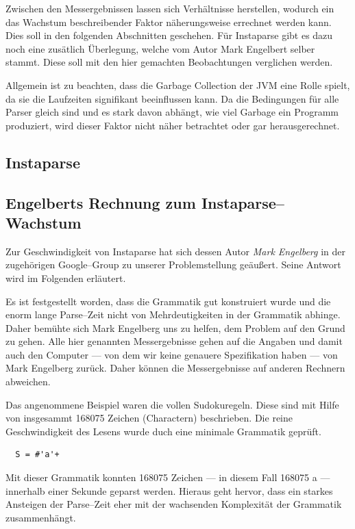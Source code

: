 \documentclass[ngerman,a4paper,abstracton,open=right,twoside=false,toc=listofnumbered,bibtotocnumbered]{scrreprt}
\begin{document}
Zwischen den Messergebnissen lassen sich Verhältnisse herstellen, wodurch ein das Wachstum beschreibender Faktor näherungsweise errechnet werden kann. Dies soll in den folgenden Abschnitten geschehen. Für Instaparse gibt es dazu noch eine zusätlich Überlegung, welche vom Autor Mark Engelbert selber stammt. Diese soll mit den hier gemachten Beobachtungen verglichen werden.

Allgemein ist zu beachten, dass die Garbage Collection der JVM eine Rolle spielt, da sie die Laufzeiten signifikant beeinflussen kann. Da die Bedingungen für alle Parser gleich sind und es stark davon abhängt, wie viel \glqq{}Garbage\grqq{} ein Programm produziert, wird dieser Faktor nicht näher betrachtet oder gar herausgerechnet.

\subsection{Instaparse}


\subsection{Engelberts Rechnung zum Instaparse--Wachstum}

Zur Geschwindigkeit von Instaparse hat sich dessen Autor \emph{Mark Engelberg} in der zugehörigen Google--Group zu unserer Problemstellung geäußert. Seine Antwort wird im Folgenden erläutert. \cite{instaparse-google-group}

Es ist festgestellt worden, dass die Grammatik gut konstruiert wurde und die enorm lange Parse--Zeit nicht von Mehrdeutigkeiten in der Grammatik abhinge. Daher bemühte sich Mark Engelberg uns zu helfen, dem Problem auf den Grund zu gehen. Alle hier genannten Messergebnisse gehen auf die Angaben und damit auch den Computer --- von dem wir keine genauere Spezifikation haben --- von Mark Engelberg zurück. Daher können die Messergebnisse auf anderen Rechnern abweichen.

Das angenommene Beispiel waren die vollen Sudokuregeln. Diese sind mit Hilfe von insgesammt 168075 Zeichen (Charactern) beschrieben. Die reine Geschwindigkeit des Lesens wurde duch eine minimale Grammatik geprüft.

\begin{lstlisting}
  S = #'a'+
\end{lstlisting}

Mit dieser Grammatik konnten 168075 Zeichen --- in diesem Fall 168075 \glqq{}a\grqq{} --- innerhalb einer Sekunde geparst werden. Hieraus geht hervor, dass ein starkes Ansteigen der Parse--Zeit eher mit der wachsenden Komplexität der Grammatik zusammenhängt.
\end{document}
